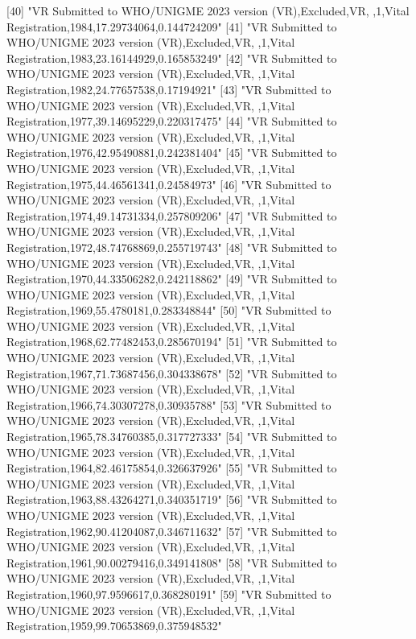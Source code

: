  [40] "VR Submitted to WHO/UNIGME 2023 version (VR),Excluded,VR, ,1,Vital Registration,1984,17.29734064,0.144724209"                 
 [41] "VR Submitted to WHO/UNIGME 2023 version (VR),Excluded,VR, ,1,Vital Registration,1983,23.16144929,0.165853249"                 
 [42] "VR Submitted to WHO/UNIGME 2023 version (VR),Excluded,VR, ,1,Vital Registration,1982,24.77657538,0.17194921"                  
 [43] "VR Submitted to WHO/UNIGME 2023 version (VR),Excluded,VR, ,1,Vital Registration,1977,39.14695229,0.220317475"                 
 [44] "VR Submitted to WHO/UNIGME 2023 version (VR),Excluded,VR, ,1,Vital Registration,1976,42.95490881,0.242381404"                 
 [45] "VR Submitted to WHO/UNIGME 2023 version (VR),Excluded,VR, ,1,Vital Registration,1975,44.46561341,0.24584973"                  
 [46] "VR Submitted to WHO/UNIGME 2023 version (VR),Excluded,VR, ,1,Vital Registration,1974,49.14731334,0.257809206"                 
 [47] "VR Submitted to WHO/UNIGME 2023 version (VR),Excluded,VR, ,1,Vital Registration,1972,48.74768869,0.255719743"                 
 [48] "VR Submitted to WHO/UNIGME 2023 version (VR),Excluded,VR, ,1,Vital Registration,1970,44.33506282,0.242118862"                 
 [49] "VR Submitted to WHO/UNIGME 2023 version (VR),Excluded,VR, ,1,Vital Registration,1969,55.4780181,0.283348844"                  
 [50] "VR Submitted to WHO/UNIGME 2023 version (VR),Excluded,VR, ,1,Vital Registration,1968,62.77482453,0.285670194"                 
 [51] "VR Submitted to WHO/UNIGME 2023 version (VR),Excluded,VR, ,1,Vital Registration,1967,71.73687456,0.304338678"                 
 [52] "VR Submitted to WHO/UNIGME 2023 version (VR),Excluded,VR, ,1,Vital Registration,1966,74.30307278,0.30935788"                  
 [53] "VR Submitted to WHO/UNIGME 2023 version (VR),Excluded,VR, ,1,Vital Registration,1965,78.34760385,0.317727333"                 
 [54] "VR Submitted to WHO/UNIGME 2023 version (VR),Excluded,VR, ,1,Vital Registration,1964,82.46175854,0.326637926"                 
 [55] "VR Submitted to WHO/UNIGME 2023 version (VR),Excluded,VR, ,1,Vital Registration,1963,88.43264271,0.340351719"                 
 [56] "VR Submitted to WHO/UNIGME 2023 version (VR),Excluded,VR, ,1,Vital Registration,1962,90.41204087,0.346711632"                 
 [57] "VR Submitted to WHO/UNIGME 2023 version (VR),Excluded,VR, ,1,Vital Registration,1961,90.00279416,0.349141808"                 
 [58] "VR Submitted to WHO/UNIGME 2023 version (VR),Excluded,VR, ,1,Vital Registration,1960,97.9596617,0.368280191"                  
 [59] "VR Submitted to WHO/UNIGME 2023 version (VR),Excluded,VR, ,1,Vital Registration,1959,99.70653869,0.375948532"                 

